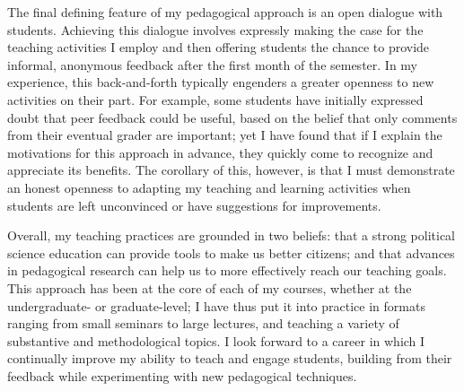 \documentclass[letterpaper]{scrartcl}
\begin{document}
The final defining feature of my pedagogical approach is an open dialogue with students. Achieving this dialogue involves expressly making the case for the teaching activities I employ and then offering students the chance to provide informal, anonymous feedback after the first month of the semester. In my experience, this back-and-forth typically engenders a greater openness to new activities on their part. For example, some students have initially expressed doubt that peer feedback could be useful, based on the belief that only comments from their eventual grader are important; yet I have found that if I explain the motivations for this approach in advance, they quickly come to recognize and appreciate its benefits. The corollary of this, however, is that I must demonstrate an honest openness to adapting my teaching and learning activities when students are left unconvinced or have suggestions for improvements. 

Overall, my teaching practices are grounded in two beliefs: that a strong political science education can provide tools to make us better citizens; and that advances in pedagogical research can help us to more effectively reach our teaching goals. This approach has been at the core of each of my courses, whether at the undergraduate- or graduate-level; I have thus put it into practice in formats ranging from small seminars to large lectures, and teaching a variety of substantive and methodological topics. I look forward to a career in which I continually improve my ability to teach and engage students, building from their feedback while experimenting with new pedagogical techniques.
\end{document}
